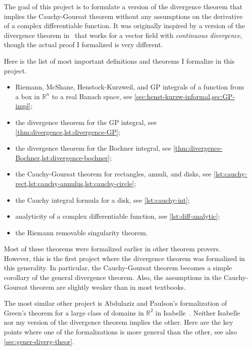 \documentclass[a4paper, UKenglish,cleveref, autoref, thm-restate]{lipics-v2021}
\newcommand{\bbR}{\mathbb{R}}
\begin{document}
The goal of this project is to formulate a version of the divergence
theorem that implies the Cauchy-Goursat theorem without any
assumptions on the derivative of a complex differentiable function. It
was originally inspired by a version of the divergence theorem
in~\cite{Acker1996} that works for a vector field with
\emph{continuous divergence}, though the actual proof I formalized is
very different.

Here is the list of most important definitions and theorems I
formalize in this project.
\begin{itemize}
\item Riemann, McShane, Henstock-Kurzweil, and GP integrals of a
  function from a box in \(\bbR^{n}\) to a real Banach space, see
  \cref{sec:henst-kurzw-informal,sec:GP-impl};
\item the divergence theorem for the GP integral, see
  \cref{thm:divergence,lst:divergence-GP};
\item the divergence theorem for the Bochner integral, see
  \cref{thm:divergence-Bochner,lst:divergence-bochner};
\item the Cauchy-Goursat theorem for rectangles, annuli, and disks,
  see \cref{lst:cauchy-rect,lst:cauchy-annulus,lst:cauchy-circle};
\item the Cauchy integral formula for a disk, see \cref{lst:cauchy-int};
\item analyticity of a complex differentiable function, see
  \cref{lst:diff-analytic};
\item the Riemann removable singularity theorem.
\end{itemize}

Most of these theorems were formalized earlier in other theorem
provers. However, this is the first project where the divergence
theorem was formalized in this generality. In particular, the
Cauchy-Goursat theorem becomes a simple corollary of the general
divergence theorem. Also, the assumptions in the Cauchy-Goursat
theorem are slightly weaker than in most textbooks.

The most similar other project is Abdulaziz and Paulson's
formalization of Green's theorem for a large class of domains in
\(\bbR^{2}\) in Isabelle~\cite{Abdulaziz_Paulson}. Neither Isabelle
nor my version of the divergence theorem implies the other. Here are
the key points where one of the formalizations is more general than
the other, see also \autoref{sec:gener-diverg-theor}.
\end{document}
